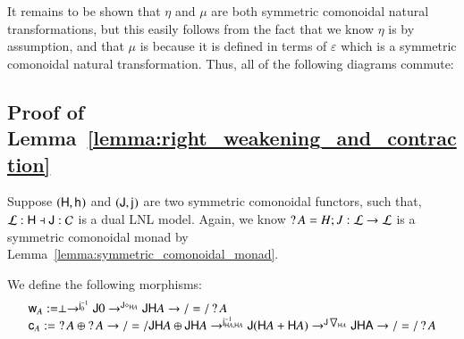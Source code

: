 It remains to be shown that $\eta$ and $\mu$ are both
symmetric comonoidal natural transformations, but this easily follows
from the fact that we know $\eta$ is by assumption, and that $\mu$
is because it is defined in terms of $\varepsilon$ which is a
symmetric comonoidal natural transformation.  Thus, all of the
following diagrams commute:

\subsection{Proof of Lemma~\ref{lemma:right_weakening_and_contraction}}
\label{subsec:proof_of_lemma:right_weakening_and_contraction}
Suppose $(\mathsf{H},\mathsf{h}_{})$ and $(\mathsf{J},\mathsf{j}_{})$ are two symmetric
comonoidal functors, such that, $\mathcal{L} : \mathsf{H} \dashv \mathsf{J}
: \mathcal{C}$ is a dual LNL model.  Again, we know $\mathop{?} A = H;J : \mathcal{L}
\rightarrow \mathcal{L}$ is a symmetric comonoidal monad by
Lemma~\ref{lemma:symmetric_comonoidal_monad}.  

We define the following morphisms:
\[
\begin{array}{lll}
  \mathsf{w}_{A} := \perp \rightarrow^{\mathsf{j}^{-1}_{0}} \mathsf{J} 0 \rightarrow^{\mathsf{J}\diamond_{\mathsf{H} A}} \mathsf{JH}A \rightarrow/=/ \mathop{?} A\\
  \mathsf{c}_{A} := \mathop{?} A \oplus \mathop{?} A \rightarrow/=/ \mathsf{JH}A \oplus \mathsf{JH}A \rightarrow^{\mathsf{j}^{-1}_{\mathsf{H}A,\mathsf{H}A}} \mathsf{J}(\mathsf{H}A + \mathsf{H}A) \rightarrow^{\mathsf{J}\bigtriangledown_{\mathsf{H}A}} \mathsf{JHA} \rightarrow/=/ \mathop{?} A
\end{array}
\]

